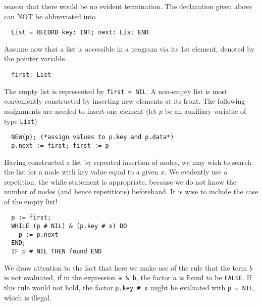 reason that there would be no evident termination. The declaration given above can NOT be
abbreviated into
\begin{verbatim}
  List = RECORD key: INT; next: List END
\end{verbatim}
Assume now that a list is accessible in a program via its 1st element, denoted by the
pointer variable
\begin{verbatim}
  first: List
\end{verbatim}
The empty list is represented by \verb|first = NIL|. A non-empty list is most conveniently
constructed by inserting new elements at its front. The following assignments are needed
to insert one element (let $p$ be an auxiliary variable of type \verb|List|)
\begin{verbatim}
  NEW(p); (*assign values to p.key and p.data*)
  p.next := first; first := p
\end{verbatim}
Having constructed a list by repeated insertion of nodes, we may wish to search the list
for a node with key value equal to a given $x$. We evidently use a repetition; the while
statement is appropriate, because we do not know the number of nodes (and hence repetitions)
beforehand. It is wise to include the case of the empty list!
\begin{verbatim}
  p := first;
  WHILE (p # NIL) & (p.key # x) DO
    p := p.next
  END;
  IF p # NIL THEN found END
\end{verbatim}
We draw attention to the fact that here we make use of the rule that the term $b$ is not
evaluated, if in the expression \verb|a & b|, the factor $a$ is found to be \verb|FALSE|.
If this rule would not hold, the factor \verb|p.key # x| might be evaluated with
\verb|p = NIL|, which is illegal.

